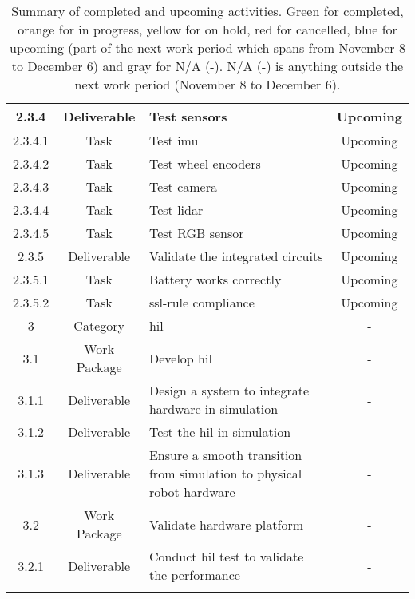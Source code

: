 \begin{longtable}{|c|c|m{}|c|}
    \rowcolor{u} 2.3.4 & Deliverable & Test sensors & Upcoming \\ \hline
    \rowcolor{u} 2.3.4.1 & Task & Test \acs{imu} & Upcoming \\ \hline
    \rowcolor{u} 2.3.4.2 & Task & Test wheel encoders & Upcoming \\ \hline
    \rowcolor{u} 2.3.4.3 & Task & Test camera & Upcoming \\ \hline
    \rowcolor{u} 2.3.4.4 & Task & Test \acs{lidar} & Upcoming \\ \hline
    \rowcolor{u} 2.3.4.5 & Task & Test RGB sensor & Upcoming \\ \hline
    \rowcolor{u} 2.3.5 & Deliverable & Validate the integrated circuits & Upcoming \\ \hline
    \rowcolor{u} 2.3.5.1 & Task & Battery works correctly & Upcoming \\ \hline
    \rowcolor{u} 2.3.5.2 & Task & \acs{ssl}-rule compliance & Upcoming \\ \hline
    \rowcolor{na} 3 & Category & \acs{hil} & - \\ \hline
    \rowcolor{na} 3.1 & Work Package & Develop \acs{hil} & - \\ \hline
    \rowcolor{na} 3.1.1 & Deliverable & Design a system to integrate hardware in simulation & - \\ \hline
    \rowcolor{na} 3.1.2 & Deliverable & Test the \acs{hil} in simulation & - \\ \hline
    \rowcolor{na} 3.1.3 & Deliverable & Ensure a smooth transition from simulation to physical robot hardware & - \\ \hline
    \rowcolor{na} 3.2 & Work Package & Validate hardware platform & - \\ \hline
    \rowcolor{na} 3.2.1 & Deliverable & Conduct \acs{hil} test to validate the performance & - \\ \hline
    \caption{Summary of completed and upcoming activities. Green for completed, orange for in progress, yellow for on hold, red for cancelled, blue for upcoming (part of the next work period which spans from November 8 to December 6) and gray for N/A (-). N/A (-) is anything outside the next work period (November 8 to December 6).}
    \label{tab:activity_status}
\end{longtable}
\twocolumn

